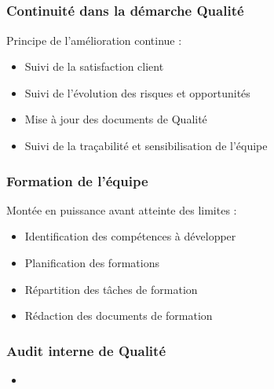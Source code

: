 \speaker{\Pierre}

\subsection{} %


\begin{frame}
\frametitle{Continuité dans la démarche Qualité}
Principe de l'amélioration continue :
\begin{itemize}
\item Suivi de la satisfaction client
\item Suivi de l'évolution des risques et opportunités
\item Mise à jour des documents de Qualité
\item Suivi de la traçabilité et sensibilisation de l'équipe
\end{itemize}
\end{frame}


\begin{frame}
\frametitle{Formation de l'équipe}
Montée en puissance avant atteinte des limites :
\begin{itemize}
\item Identification des compétences à développer
\item Planification des formations
\item Répartition des tâches de formation
\item Rédaction des documents de formation
\end{itemize}
\end{frame}


\begin{frame}
\frametitle{Audit interne de Qualité}
\begin{itemize}
\item 
\end{itemize}
\end{frame}





